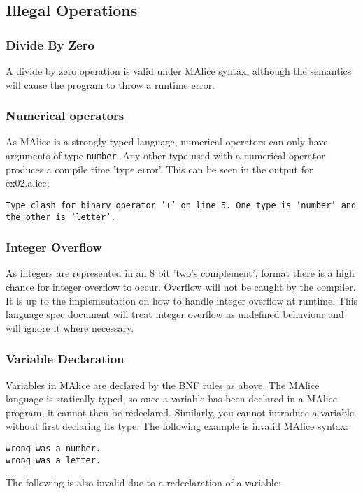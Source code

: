 \documentclass[a4wide, 10pt]{article}
\newcommand{\tab}{\hspace*{2em}}
\begin{document}
\subsection{Illegal Operations}

\subsubsection{Divide By Zero}
A divide by zero operation is valid under MAlice syntax, although the
semantics will cause the program to throw a runtime error.

\subsubsection{Numerical operators}
As MAlice is a strongly typed language, numerical operators can only have 
arguments of type \texttt{number}. Any other type used with a numerical operator
produces a compile time 'type error'. This can be seen in the output for 
ex02.alice:

\texttt{Type clash for binary operator '+' on line 5. One type is 'number' and 
the other is 'letter'.}

\subsubsection{Integer Overflow}
As integers are represented in an 8 bit 'two's complement', format there is 
a high chance for integer overflow to occur. Overflow will not be caught
by the compiler. It is up to the implementation on how to handle integer 
overflow at runtime. This language spec document will treat integer 
overflow as undefined behaviour and will ignore it where necessary.

\subsubsection{Variable Declaration}
Variables in MAlice are declared by the BNF rules as above. The MAlice 
language is statically typed, so once a variable has been declared in a
MAlice program, it cannot then be redeclared. Similarly, you cannot introduce
a variable without first declaring its type. The following example is
invalid MAlice syntax:

\texttt{\tab wrong was a number.\\ \tab wrong was a letter.}

The following is also invalid due to a redeclaration of a variable:
\end{document}
